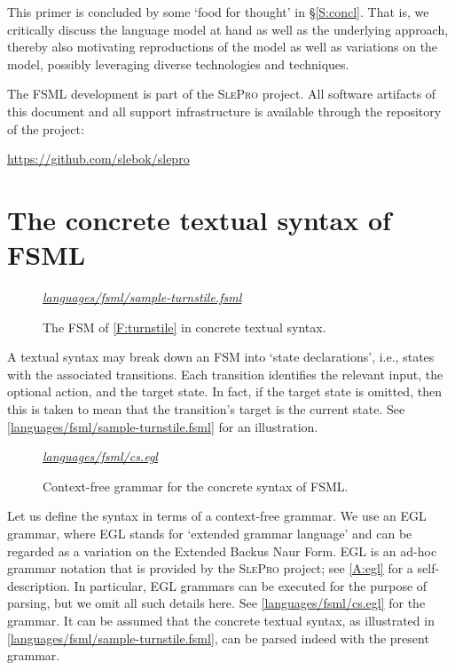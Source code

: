 \documentclass[preprint,authoryear,12pt]{noelsarticle}
\newcommand{\slepro}{\textsc{SlePro}}
\newcommand{\codefigure}[3]{
\begin{figure}[t!]
\begin{boxedminipage}{\hsize}
\mbox{}\hfill{}{\small\textit{\href{http://github.com/slebok/slepro/tree/master/#2}{#2}}}

\end{boxedminipage}
\caption{#1.}
\label{#2}
\medskip
\end{figure}}
\begin{document}
This primer is concluded by some `food for thought' in
\S\ref{S:concl}. That is, we critically discuss the language model at
hand as well as the underlying approach, thereby also motivating
reproductions of the model as well as variations on the model,
possibly leveraging diverse technologies and techniques.

The FSML development is part of the \slepro{} project. All software
artifacts of this document and all support infrastructure is available
through the repository of the project:

\begin{center}
\url{https://github.com/slebok/slepro}
\end{center}


\section{The concrete textual syntax of FSML}
\label{S:textual}

\codefigure{%
The FSM of \autoref{F:turnstile} in concrete textual syntax}{%
languages/fsml/sample-turnstile.fsml}{%
fsml}

A textual syntax may break down an FSM into `state declarations',
i.e., states with the associated transitions. Each transition
identifies the relevant input, the optional action, and the target
state. In fact, if the target state is omitted, then this is taken to
mean that the transition's target is the current state. See
\autoref{languages/fsml/sample-turnstile.fsml} for an illustration.

\codefigure{%
Context-free grammar for the concrete syntax of FSML}{%
languages/fsml/cs.egl}{%
egl}

Let us define the syntax in terms of a context-free grammar. We use an
EGL grammar, where EGL stands for `extended grammar language' and can
be regarded as a variation on the Extended Backus Naur Form. EGL is an
ad-hoc grammar notation that is provided by the \slepro{} project; see
\ref{A:egl} for a self-description. In particular, EGL grammars can
be executed for the purpose of parsing, but we omit all such details
here. See \autoref{languages/fsml/cs.egl} for the grammar. It can be
assumed that the concrete textual syntax, as illustrated in
\autoref{languages/fsml/sample-turnstile.fsml}, can be parsed indeed
with the present grammar.

\end{document}
